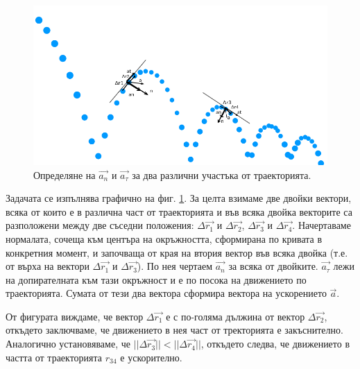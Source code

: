 \documentclass[12pt]{article}
\begin{document}
\begin{figure}
\centering
\includegraphics[width=1\textwidth]{images/circular_tangent_a.png}
\caption{\label{fig:circultar-tangent-a} Определяне на \(\vec{a_n}\) и \(\vec{a_\tau}\) за два различни участъка от траекторията.}
\end{figure}


Задачата се изпълнява графично на фиг. \ref{fig:circultar-tangent-a}. За целта взимаме две двойки вектори, всяка от които е в различна част от траекторията и във всяка двойка векторите са разположени между две съседни положения: \(\Delta \vec{r_1}\) и \(\Delta \vec{r_2}\), \(\Delta \vec{r_3}\) и \(\Delta \vec{r_4}\). Начертаваме нормалата, сочеща към центъра на окръжността, сформирана по кривата в конкретния момент, и започваща от края на втория вектор във всяка двойка (т.е. от върха на вектори \(\Delta \vec{r_1}\) и \(\Delta \vec{r_3}\)). По нея чертаем \(\vec{a_n}\) за всяка от двойките. \(\vec{a_\tau}\) лежи на допирателната към тази окръжност и е по посока на движението по траекторията. Сумата от тези два вектора сформира вектора на ускорението \(\vec{a}\).

От фигурата виждаме, че вектор \(\Delta \vec{r_1}\) е с по-голяма дължина от вектор \(\Delta \vec{r_2}\), откъдето заключваме, че движението в нея част от тректорията е закъснително. Аналогично установяваме, че \(||\Delta \vec{r_3}|| < ||\Delta \vec{r_4}||\), откъдето следва, че движението в частта от траекторията \(r_{34}\) е ускорително.
\pagebreak
\printbibliography
\end{document}
